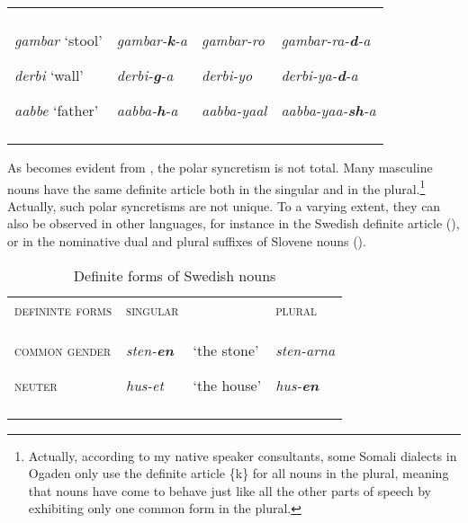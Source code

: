 \documentclass[output=paper]{langsci/langscibook}
\begin{document}
\begin{table}
\begin{tabularx}{\textwidth}{XXXX}
{}\\
\hhline{~~--}
{\textit{gambar} ‘stool’}

{\textit{derbi} ‘wall’}

{\textit{aabbe} ‘father’} & {\textit{gambar-}\textbf{\textit{k}}\textit{{}-a}}

{\textit{derbi-}\textbf{\textit{g}}\textit{{}-a}}

{\textit{aabba-}\textbf{\textit{h}}\textit{{}-a}} & {\textit{gambar-ro}}

{\textit{derbi-yo}}

{\textit{aabba-yaal}} & {\textit{gambar-ra-}\textbf{\textit{d}}\textit{{}-a}}

{\textit{derbi-ya-}\textbf{\textit{d}}\textit{{}-a}}

{\textit{aabba-yaa-}\textbf{\textit{sh}}\textit{{}-a}}\\
\lspbottomrule
\end{tabularx}
\end{table} 


As becomes evident from , the polar syncretism is not total. Many masculine nouns have the same definite article both in the singular and in the plural.\footnote{Actually, according to my native speaker consultants, some Somali dialects in Ogaden only use the definite article \{k\} for all nouns in the plural, meaning that nouns have come to behave just like all the other parts of speech by exhibiting only one common form in the plural.} Actually, such polar syncretisms are not unique. To a varying extent, they can also be observed in other languages, for instance in the Swedish definite article (), or in the nominative dual and plural suffixes of Slovene nouns ().
 
\begin{table}
\caption{Definite forms of Swedish nouns}
\label{tab:7}

\begin{tabularx}{\textwidth}{XXXX}
\lsptoprule
{\textsc{defininte forms}} & {\textsc{singular}} &  & {\textsc{plural}}\\
{\textsc{common gender}}

{\textsc{neuter}} & {\textit{sten-}\textbf{\textit{en}}}

{\textit{hus-et}} & {‘the stone’}

{‘the house’} & {\textit{sten-arna}}

{\textit{hus-}\textbf{\textit{en}}}\\
\lspbottomrule
\end{tabularx}

\end{table} 
\end{document}
